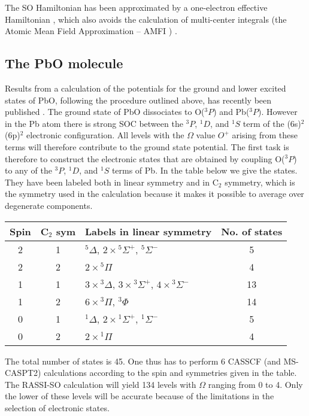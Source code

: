 The SO Hamiltonian has been approximated by a one-electron effective
Hamiltonian \cite{Hess:96}, which also avoids the calculation of multi-center
integrals (the Atomic Mean Field Approximation -- AMFI ) 
\cite{Hess:96,Schimmelpfennig:96}.

\subsection{The PbO molecule}
Results from a calculation of the potentials for the ground and lower excited
states of PbO, following the procedure outlined above, has recently been
published \cite{Roos:03h}. The ground state of PbO dissociates to O($^3P$) and
Pb($^3P$). However in the Pb atom there is strong SOC between the $^3P$, $^1D$,
and $^1S$ term of the (6s)$^2$(6p)$^2$ electronic configuration. All levels with
the $\Omega$ value $O^+$  arising from these terms will therefore contribute to
the ground state potential. The first task is therefore to construct the
electronic states that are obtained by coupling O($^3P$) to any of the $^3P$, 
$^1D$, and $^1S$ terms of Pb. In the table below we give the states. They have
been labeled both in linear symmetry and in C$_2$ symmetry, which is the
symmetry used in the calculation because it makes it possible to average over
degenerate components.

\begin{tabular}{cclc}
Spin & C$_2$ sym & Labels in linear symmetry & No. of states \\
\hline
2    & 1 &  $^5\Delta$, $2\times{^5\Sigma^+}$, ${^5\Sigma^-}$             &  5 \\
2    & 2 &  $2\times{^5\Pi}$				             &  4 \\
1    & 1 &  $3\times{^3\Delta}$, $3\times{^3\Sigma^+}$, $4\times{^3\Sigma^-}$ & 13 \\
1    & 2 &  $6\times{^3\Pi}$, $^3\Phi$ 				     & 14 \\
0    & 1 &  $^1\Delta$, $2\times{^1\Sigma^+}$, $^1\Sigma^-$  	     &	5 \\
0    & 2 &  $2\times{^1\Pi}$					     &  4 \\
\hline
\end{tabular}

The total number of states is 45. One thus has to perform 6 CASSCF (and
MS-CASPT2) calculations according to the spin and symmetries given in the table.
The RASSI-SO calculation will yield 134 levels with $\Omega$ ranging from 0 to
4. Only the lower of these levels will be accurate because of the limitations in
the selection of electronic states.

